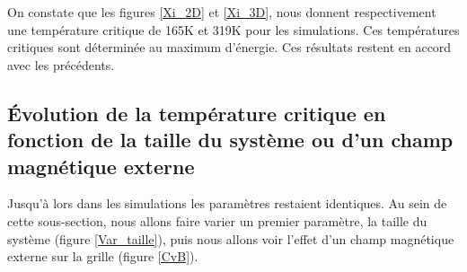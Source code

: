 \documentclass{article}
\begin{document}
On constate que les figures \ref{Xi_2D} et \ref{Xi_3D}, nous donnent respectivement une température critique de 165K et 319K pour les simulations. Ces températures critiques sont déterminée au maximum d'énergie. Ces résultats restent en accord avec les précédents. 

\subsection{Évolution de la température critique en fonction de la taille du système ou d'un champ magnétique externe}

Jusqu'à lors dans les simulations les paramètres restaient identiques. Au sein de cette sous-section, nous allons faire varier un premier paramètre, la taille du système (figure \ref{Var_taille}), puis nous allons voir l'effet d'un champ magnétique externe sur la grille (figure \ref{CvB}).
\end{document}
